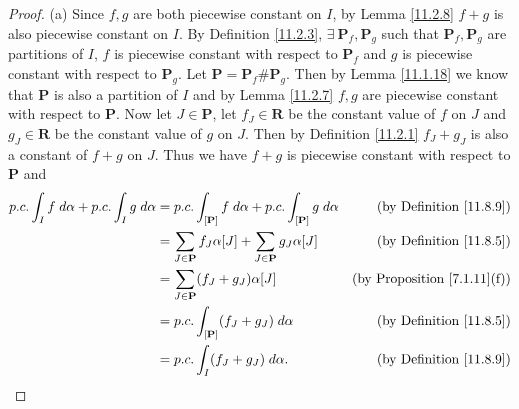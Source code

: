 \begin{proof}{(a)}
    Since \(f, g\) are both piecewise constant on \(I\), by Lemma \ref{11.2.8} \(f + g\) is also piecewise constant on \(I\).
    By Definition \ref{11.2.3}, \(\exists\ \mathbf{P}_f, \mathbf{P}_g\) such that \(\mathbf{P}_f, \mathbf{P}_g\) are partitions of \(I\), \(f\) is piecewise constant with respect to \(\mathbf{P}_f\) and \(g\) is piecewise constant with respect to \(\mathbf{P}_g\).
    Let \(\mathbf{P} = \mathbf{P}_f \# \mathbf{P}_g\).
    Then by Lemma \ref{11.1.18} we know that \(\mathbf{P}\) is also a partition of \(I\) and by Lemma \ref{11.2.7} \(f, g\) are piecewise constant with respect to \(\mathbf{P}\).
    Now let \(J \in \mathbf{P}\), let \(f_J \in \mathbf{R}\) be the constant value of \(f\) on \(J\) and \(g_J \in \mathbf{R}\) be the constant value of \(g\) on \(J\).
    Then by Definition \ref{11.2.1} \(f_J + g_J\) is also a constant of \(f + g\) on \(J\).
    Thus we have \(f + g\) is piecewise constant with respect to \(\mathbf{P}\) and
    \begin{align*}
        p.c. \int_I f \; d \alpha + p.c. \int_I g \; d \alpha & = p.c. \int_{[\mathbf{P}]} f \; d \alpha + p.c. \int_{[\mathbf{P}]} g \; d \alpha & \text{(by Definition \ref{11.8.9})}     \\
                                                              & = \sum_{J \in \mathbf{P}} f_J \alpha[J] + \sum_{J \in \mathbf{P}} g_J \alpha[J]   & \text{(by Definition \ref{11.8.5})}     \\
                                                              & = \sum_{J \in \mathbf{P}} (f_J + g_J) \alpha[J]                                   & \text{(by Proposition \ref{7.1.11}(f))} \\
                                                              & = p.c. \int_{[\mathbf{P}]} (f_J + g_J) \; d \alpha                                & \text{(by Definition \ref{11.8.5})}     \\
                                                              & = p.c. \int_I (f_J + g_J) \; d \alpha.                                            & \text{(by Definition \ref{11.8.9})}
    \end{align*}
\end{proof}

